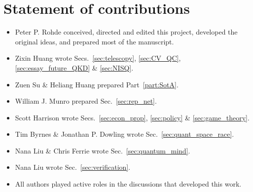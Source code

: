 %
%

\section*{Statement of contributions}

\begin{itemize}
\item Peter P. Rohde conceived, directed and edited this project, developed the original ideas, and prepared most of the manuscript.
\item Zixin Huang wrote Secs.~\ref{sec:telescopy}, \ref{sec:CV_QC}, \ref{sec:essay_future_QKD} \& \ref{sec:NISQ}.
\item Zuen Su \& Heliang Huang prepared Part~\ref{part:SotA}.
\item William J. Munro prepared Sec.~\ref{sec:rep_net}. 
\item Scott Harrison wrote Secs.~\ref{sec:econ_prop}, \ref{sec:policy} \& \ref{sec:game_theory}.
\item Tim Byrnes \& Jonathan P. Dowling wrote Sec.~\ref{sec:quant_space_race}.
\item Nana Liu \& Chris Ferrie wrote Sec.~\ref{sec:quantum_mind}.
\item Nana Liu wrote Sec.~\ref{sec:verification}.
\item All authors played active roles in the discussions that developed this work. 
\end{itemize}

